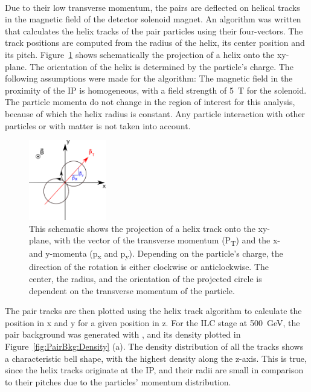 \\Due to their low transverse momentum, the pairs are deflected on helical tracks in the magnetic field of the detector solenoid magnet.
An algorithm was written that calculates the helix tracks of the pair particles using their four-vectors. 
The track positions are computed from the radius of the helix, its center position and its pitch.
Figure~\ref{fig:helix_circle} shows schematically the projection of a helix onto the xy-plane.
The orientation of the helix is determined by the particle's charge.
The following assumptions were made for the algorithm:
The magnetic field in the proximity of the IP is homogeneous, with a field strength of \SI{5}{\tesla} for the \sid solenoid.
The particle momenta do not change in the region of interest for this analysis, because of which the helix radius is constant.
Any particle interaction with other particles or with matter is not taken into account.\\
\begin{figure}
    \centering
    \includegraphics[width=0.3\textwidth]{Figures/Pairs/Helix_explanation.png}
    \caption[Schematic projection of the helix on the xy-plane]{
    This schematic shows the projection of a helix track onto the xy-plane, with the vector of the transverse momentum (P\textsubscript{T}) and the x- and y-momenta (p\textsubscript{x} and p\textsubscript{y}).
    Depending on the particle's charge, the direction of the rotation is either clockwise or anticlockwise.
    The center, the radius, and the orientation of the projected circle is dependent on the transverse momentum of the particle.
    }
    \label{fig:helix_circle}
\end{figure}
The pair tracks are then plotted using the helix track algorithm to calculate the position in x and y for a given position in z.
For the ILC stage at \SI{500}{\GeV}, the pair background was generated with \guineapig, and its density plotted in Figure~\ref{fig:PairBkg:Density} (a).
The density distribution of all the tracks shows a characteristic bell shape, with the highest density along the z-axis.
This is true, since the helix tracks originate at the IP, and their radii are small in comparison to their pitches due to the particles' momentum distribution.
